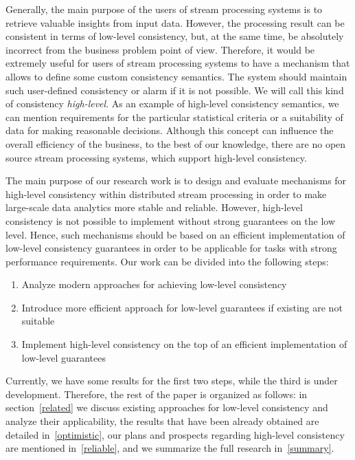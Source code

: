 \documentclass{llncs}
\begin{document}
Generally, the main purpose of the users of stream processing systems is to retrieve valuable insights from input data. However, the processing result can be consistent in terms of low-level consistency, but, at the same time, be absolutely incorrect from the business problem point of view. Therefore, it would be extremely useful for users of stream processing systems to have a mechanism that allows to define some custom consistency semantics. The system should maintain such user-defined consistency or alarm if it is not possible. We will call this kind of consistency {\em high-level}. As an example of high-level consistency semantics, we can mention requirements for the particular statistical criteria or a suitability of data for making reasonable decisions. Although this concept can influence the overall efficiency of the business, to the best of our knowledge, there are no open source stream processing systems, which support high-level consistency.

The main purpose of our research work is to design and evaluate mechanisms for high-level consistency within distributed stream processing in order to make large-scale data analytics more stable and reliable. However, high-level consistency is not possible to implement without strong guarantees on the low level. Hence, such mechanisms should be based on an efficient implementation of low-level consistency guarantees in order to be applicable for tasks with strong performance requirements. Our work can be divided into the following steps:

\begin{enumerate}
    \item Analyze modern approaches for achieving low-level consistency
    \item Introduce more efficient approach for low-level guarantees if existing are not suitable
    \item Implement high-level consistency on the top of an efficient implementation of low-level guarantees
\end{enumerate}

Currently, we have some results for the first two steps, while the third is under development. Therefore, the rest of the paper is organized as follows: in section~\ref{related} we discuss existing approaches for low-level consistency and analyze their applicability, the results that have been already obtained are detailed in~\ref{optimistic}, our plans and prospects regarding high-level consistency are mentioned in~\ref{reliable}, and we summarize the full research in~\ref{summary}.
\end{document}
